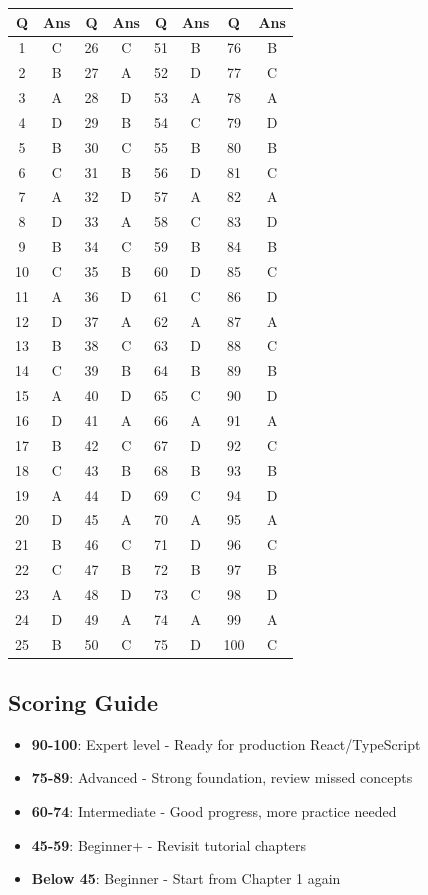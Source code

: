 \documentclass[12pt,a4paper]{article}
\begin{document}
\begin{center}
\begin{tabular}{|c|c||c|c||c|c||c|c|}
\hline
\textbf{Q} & \textbf{Ans} & \textbf{Q} & \textbf{Ans} & \textbf{Q} & \textbf{Ans} & \textbf{Q} & \textbf{Ans} \\
\hline
1 & C & 26 & C & 51 & B & 76 & B \\
2 & B & 27 & A & 52 & D & 77 & C \\
3 & A & 28 & D & 53 & A & 78 & A \\
4 & D & 29 & B & 54 & C & 79 & D \\
5 & B & 30 & C & 55 & B & 80 & B \\
6 & C & 31 & B & 56 & D & 81 & C \\
7 & A & 32 & D & 57 & A & 82 & A \\
8 & D & 33 & A & 58 & C & 83 & D \\
9 & B & 34 & C & 59 & B & 84 & B \\
10 & C & 35 & B & 60 & D & 85 & C \\
11 & A & 36 & D & 61 & C & 86 & D \\
12 & D & 37 & A & 62 & A & 87 & A \\
13 & B & 38 & C & 63 & D & 88 & C \\
14 & C & 39 & B & 64 & B & 89 & B \\
15 & A & 40 & D & 65 & C & 90 & D \\
16 & D & 41 & A & 66 & A & 91 & A \\
17 & B & 42 & C & 67 & D & 92 & C \\
18 & C & 43 & B & 68 & B & 93 & B \\
19 & A & 44 & D & 69 & C & 94 & D \\
20 & D & 45 & A & 70 & A & 95 & A \\
21 & B & 46 & C & 71 & D & 96 & C \\
22 & C & 47 & B & 72 & B & 97 & B \\
23 & A & 48 & D & 73 & C & 98 & D \\
24 & D & 49 & A & 74 & A & 99 & A \\
25 & B & 50 & C & 75 & D & 100 & C \\
\hline
\end{tabular}
\end{center}

\vspace{1cm}

\subsection*{Scoring Guide}
\begin{itemize}
    \item \textbf{90-100}: Expert level - Ready for production React/TypeScript
    \item \textbf{75-89}: Advanced - Strong foundation, review missed concepts
    \item \textbf{60-74}: Intermediate - Good progress, more practice needed
    \item \textbf{45-59}: Beginner+ - Revisit tutorial chapters
    \item \textbf{Below 45}: Beginner - Start from Chapter 1 again
\end{itemize}
\end{document}
